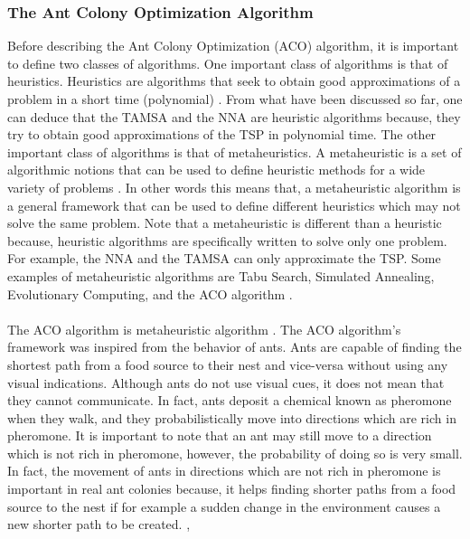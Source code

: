 \documentclass{article}
\begin{document}
\subsubsection{The Ant Colony Optimization Algorithm}
Before describing the Ant Colony Optimization (ACO) algorithm, it is important to define two classes of algorithms. One important class of algorithms is that of heuristics. Heuristics are algorithms that seek to obtain good approximations of a problem in a short time (polynomial) \cite{dorigo_stutzle_thomas_2004}. From what have been discussed so far, one can deduce that the TAMSA and the NNA are heuristic algorithms because, they try to obtain good approximations of the TSP in polynomial time. The other important class of algorithms is that of metaheuristics.  A metaheuristic is a set of algorithmic notions that can be used to define heuristic methods for a wide variety of problems \cite{dorigo_stutzle_thomas_2004}. In other words this means that, a metaheuristic algorithm is a general framework that can be used to define different heuristics which may not solve the same problem. Note that a metaheuristic is different than a heuristic because, heuristic algorithms are specifically written to solve only one problem. For example, the NNA and the TAMSA can only approximate the TSP. Some examples of metaheuristic algorithms are Tabu Search, Simulated Annealing, Evolutionary Computing, and the ACO algorithm \cite{dorigo_stutzle_thomas_2004}.\\\\
The ACO algorithm is metaheuristic algorithm \cite{dorigo_stutzle_thomas_2004}. The ACO algorithm's framework was inspired from the behavior of ants. Ants are capable of finding the shortest path from a food source to their nest and vice-versa without using any visual indications. Although ants do not use visual cues, it does not mean that they cannot communicate. In fact, ants deposit a chemical known as pheromone when they walk, and they probabilistically move into directions which are rich in pheromone. It is important to note that an ant may still move to a direction which is not rich in pheromone, however, the probability of doing so is very small. In fact, the movement of ants in directions which are not rich in pheromone is important in real ant colonies because, it helps finding shorter paths from a food source to the nest if for example a sudden change in the environment causes a new shorter path to be created. \cite{dorigo_gambardella_1997}, \cite{dorigo_stutzle_thomas_2004}\\\\ 
\end{document}
